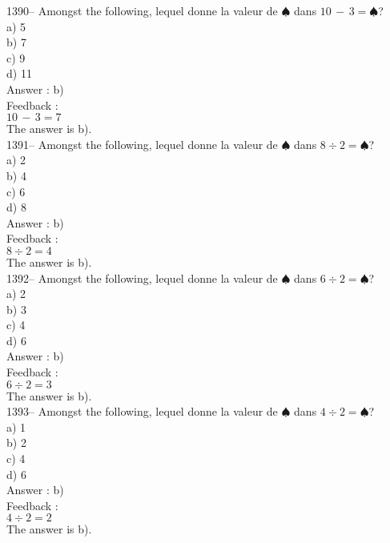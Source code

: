\documentclass[letterpaper, 12pt]{article}
\begin{document}
1390-- Amongst the following, lequel donne la valeur de
$\spadesuit$ dans $10\,-\,3=\spadesuit$?\\
a) 5\\
b) 7\\
c) 9\\
d) 11\\

Answer : b)\\

Feedback : \\
$10\,-\,3=7$\\
The answer is b).\\

1391-- Amongst the following, lequel donne la valeur de
$\spadesuit$ dans $8\div2=\spadesuit$?\\
a) 2\\
b) 4\\
c) 6\\
d) 8\\

Answer : b)\\

Feedback : \\
$8\div2=4$\\
The answer is b).\\

1392-- Amongst the following, lequel donne la valeur de
$\spadesuit$ dans $6\div2=\spadesuit$?\\
a) 2\\
b) 3\\
c) 4\\
d) 6\\

Answer : b)\\

Feedback : \\
$6\div2=3$\\
The answer is b).\\

1393-- Amongst the following, lequel donne la valeur de
$\spadesuit$ dans $4\div2=\spadesuit$?\\
a) 1\\
b) 2\\
c) 4\\
d) 6\\

Answer : b)\\

Feedback : \\
$4\div2=2$\\
The answer is b).\\
\end{document}
